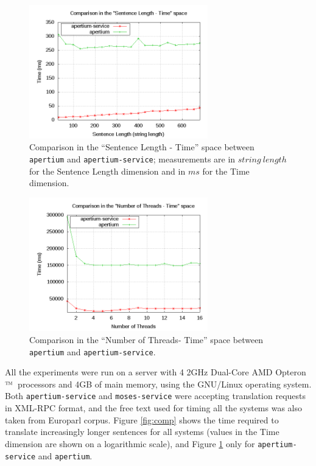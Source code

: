 \documentclass[11pt]{article}
\begin{document}
\begin{figure}[!ht]
\begin{center}
\includegraphics[width=7.75cm]{compap}
\end{center}
\caption{Comparison in the ``Sentence Length - Time'' space between {\tt apertium} and {\tt apertium-service}; measurements are in $string\ length$ for the Sentence Length dimension and in $ms$ for the Time dimension.}
\label{fig:compap}
\end{figure}

\begin{figure}[!ht]
\begin{center}
\includegraphics[width=7.75cm]{compmt}
\end{center}
\caption{Comparison in the ``Number of Threads- Time'' space between {\tt apertium} and {\tt apertium-service}.}
\label{fig:compmt}
\end{figure}

All the experiments were run on a server with 4 2GHz Dual-Core AMD Opteron${\mbox{\small\texttrademark}}$\ processors and 4GB of main memory, using the GNU/Linux operating system. Both {\tt apertium-service} and {\tt moses-service} were accepting translation requests in XML-RPC format, and the free text used for timing all the systems was also taken from Europarl corpus. Figure \ref{fig:comp} shows the time required to translate increasingly longer sentences for all systems (values in the Time dimension are shown on a logarithmic scale), and Figure \ref{fig:compap} only for {\tt apertium-service} and {\tt apertium}.
\end{document}

